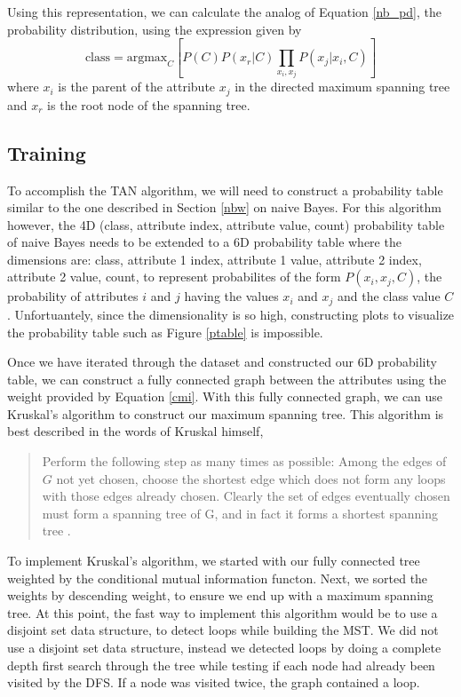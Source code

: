 \documentclass{article}
\begin{document}
		Using this representation, we can calculate the analog of Equation \ref{nb_pd}, the probability distribution, using the expression given by \cite{Zheng2010}
		\begin{equation}
			\text{class} = \text{argmax}_C \left[ P(C) P(x_r | C) \prod_{x_i,x_j} P(x_j | x_i , C) \right]
			\label{tan_pd}
		\end{equation}	
		where $x_i$ is the parent of the attribute $x_j$ in the directed maximum spanning tree and $x_r$ is the root node of the spanning tree.

	\subsection{Training}
		
		To accomplish the TAN algorithm, we will need to construct a probability table similar to the one described in Section \ref{nbw} on naive Bayes. For this algorithm however, the 4D (class, attribute index, attribute value, count) probability table of naive Bayes needs to be extended to a 6D probability table where the dimensions are: class, attribute 1 index, attribute 1 value, attribute 2 index, attribute 2 value, count, to represent probabilites of the form $P(x_i,x_j,C)$, the probability of attributes $i$ and $j$ having the values $x_i$ and $x_j$ and the class value $C$. Unfortuantely, since the dimensionality is so high, constructing plots to visualize the probability table such as Figure \ref{ptable} is impossible.
		
		Once we have iterated through the dataset and constructed our 6D probability table, we can construct a fully connected graph between the attributes using the weight provided by Equation \ref{cmi}. With this fully connected graph, we can use Kruskal's algorithm to construct our maximum spanning tree. This algorithm is best described in the words of Kruskal himself,
		\begin{quote}
			Perform the following step as many times as possible: Among the edges of $G$ not yet chosen, choose the shortest edge which does not form any loops with those edges already chosen. Clearly the set of edges eventually chosen must form a spanning tree of G, and in fact it forms a shortest spanning tree \cite{kruskal}.
		\end{quote}
		To implement Kruskal's algorithm, we started with our fully connected tree weighted by the conditional mutual information functon. Next, we sorted the weights by descending weight, to ensure we end up with a maximum spanning tree. At this point, the fast way to implement this algorithm would be to use a disjoint set data structure, to detect loops while building the MST. We did not use a disjoint set data structure, instead we detected loops by doing a complete depth first search through the tree while testing if each node had already been visited by the DFS. If a node was visited twice, the graph contained a loop. 
		
\end{document}
